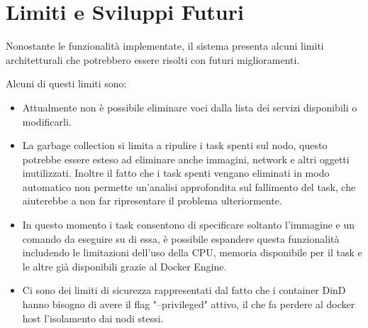 \documentclass[12pt,a4paper]{article}
\begin{document}
\section{Limiti e Sviluppi Futuri}
Nonostante le funzionalità implementate, il sistema presenta alcuni limiti architetturali che potrebbero essere risolti con futuri miglioramenti.

Alcuni di questi limiti sono:
\begin{itemize}
    \item Attualmente non è possibile eliminare voci dalla lista dei servizi disponibili o modificarli.
    \item La garbage collection si limita a ripulire i task spenti sul nodo, questo potrebbe essere esteso ad eliminare anche immagini, network e altri oggetti inutilizzati. Inoltre il fatto che i task spenti vengano eliminati in modo automatico non permette un'analisi approfondita sul fallimento del task, che aiuterebbe a non far ripresentare il problema ulteriormente.
    \item In questo momento i task consentono di specificare soltanto l'immagine e un comando da eseguire su di essa, è possibile espandere questa funzionalità includendo le limitazioni dell'uso della CPU, memoria disponibile per il task e le altre già disponibili grazie al Docker Engine.
    \item Ci sono dei limiti di sicurezza rappresentati dal fatto che i container DinD hanno bisogno di avere il flag "--privileged" attivo, il che fa perdere al docker host l'isolamento dai nodi stessi.
\end{itemize}
\end{document}
